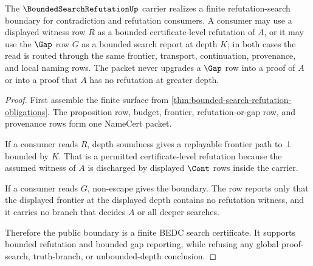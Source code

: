 \begin{theorem}
\label{thm:bounded-search-refutation-namecert-boundary}
The $\BoundedSearchRefutationUp$ carrier realizes a finite refutation-search boundary for contradiction and refutation consumers. A consumer may use a displayed witness row $R$ as a bounded certificate-level refutation of $A$, or it may use the $\Gap$ row $G$ as a bounded search report at depth $K$; in both cases the read is routed through the same frontier, transport, continuation, provenance, and local naming rows. The packet never upgrades a $\Gap$ row into a proof of $A$ or into a proof that $A$ has no refutation at greater depth.
\end{theorem}
\begin{proof}
First assemble the finite surface from \autoref{thm:bounded-search-refutation-obligations}. The proposition row, budget, frontier, refutation-or-gap row, and provenance rows form one NameCert packet.

If a consumer reads $R$, depth soundness gives a replayable frontier path to $\bot$ bounded by $K$. That is a permitted certificate-level refutation because the assumed witness of $A$ is discharged by displayed $\Cont$ rows inside the carrier.

If a consumer reads $G$, non-escape gives the boundary. The row reports only that the displayed frontier at the displayed depth contains no refutation witness, and it carries no branch that decides $A$ or all deeper searches.

Therefore the public boundary is a finite BEDC search certificate. It supports bounded refutation and bounded gap reporting, while refusing any global proof-search, truth-branch, or unbounded-depth conclusion.
\end{proof}

